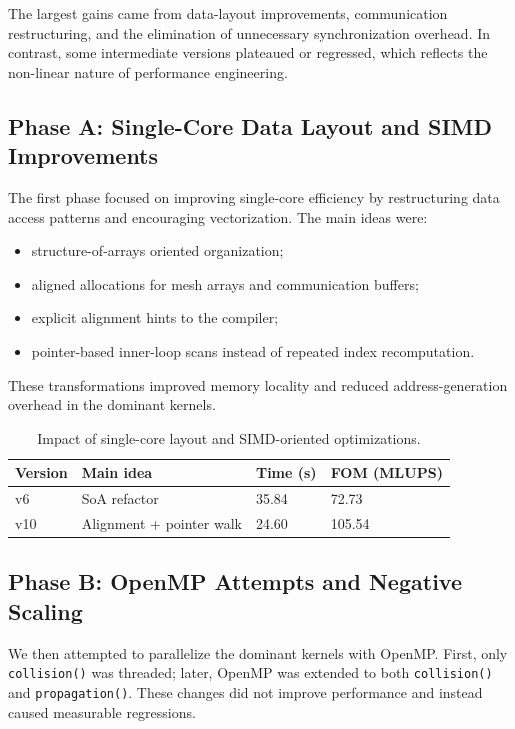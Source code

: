 \documentclass[11pt,a4paper]{article}
\begin{document}
The largest gains came from data-layout improvements, communication restructuring, and the elimination of unnecessary synchronization overhead. In contrast, some intermediate versions plateaued or regressed, which reflects the non-linear nature of performance engineering.

\subsection{Phase A: Single-Core Data Layout and SIMD Improvements}

The first phase focused on improving single-core efficiency by restructuring data access patterns and encouraging vectorization. The main ideas were:
\begin{itemize}[leftmargin=1.5em]
  \item structure-of-arrays oriented organization;
  \item aligned allocations for mesh arrays and communication buffers;
  \item explicit alignment hints to the compiler;
  \item pointer-based inner-loop scans instead of repeated index recomputation.
\end{itemize}

These transformations improved memory locality and reduced address-generation overhead in the dominant kernels.

\begin{table}[H]
  \centering
  \caption{Impact of single-core layout and SIMD-oriented optimizations.}
  \label{tab:phase-a-results}
  \begin{tabular}{@{}llll@{}}
    \toprule
    Version & Main idea & Time (s) & FOM (MLUPS) \\
    \midrule
    v6 & SoA refactor & 35.84 & 72.73 \\
    v10 & Alignment + pointer walk & 24.60 & 105.54 \\
    \bottomrule
  \end{tabular}
\end{table}

\subsection{Phase B: OpenMP Attempts and Negative Scaling}

We then attempted to parallelize the dominant kernels with OpenMP. First, only \texttt{collision()} was threaded; later, OpenMP was extended to both \texttt{collision()} and \texttt{propagation()}. These changes did not improve performance and instead caused measurable regressions.
\end{document}
